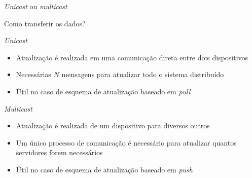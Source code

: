 \documentclass[compress]{beamer}
\begin{document}
\begin{frame}{\textit{Unicast} ou \textit{multicast}}

Como transferir os dados?

\vspace{0.5cm}

\textit{Unicast}
\begin{itemize}
    \item Atualização é realizada em uma comunicação direta entre dois dispositivos
    \item Necessárias $N$ mensagens para atualizar todo o sistema distribuído
    \item Útil no caso de esquema de atualização baseado em \textit{pull}
\end{itemize}

\vspace{0.5cm}

\textit{Multicast}
\begin{itemize}
    \item Atualização é realizada de um dispositivo para diversos outros
    \item Um único processo de comunicação é necessário para atualizar quantos servidores forem necessários
    \item Útil no caso de esquema de atualização baseado em \textit{push}
\end{itemize}
\end{frame}
\end{document}
